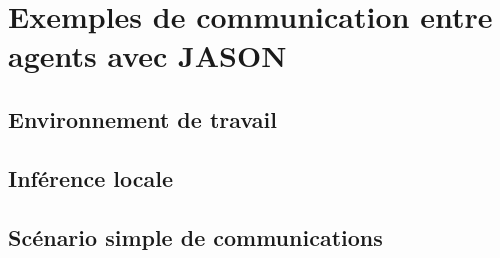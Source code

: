 \chapter{Exemples de communication entre agents avec JASON}
\section{Environnement de travail}
\section{Inférence locale}
\section{Scénario simple de communications}
